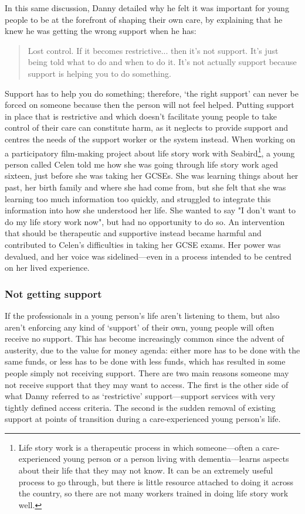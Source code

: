 In this same discussion, Danny detailed why he felt it was important for young people to be at the forefront of shaping their own care, by explaining that he knew he was getting the wrong support when he has:
\begin{quote}
Lost control. If it becomes restrictive... then it's not support. It's just being told what to do and when to do it. It's not actually support because support is helping you to do something.
\end{quote}
Support has to help you do something; therefore, `the right support' can never be forced on someone because then the person will not feel helped. Putting support in place that is restrictive and which doesn't facilitate young people to take control of their care can constitute harm, as it neglects to provide support and centres the needs of the support worker or the system instead.  When working on a participatory film-making project about life story work with Seabird\footnote{Life story work is a therapeutic process in which someone—often a care-experienced young person or a person living with dementia—learns aspects about their life that they may not know. It can be an extremely useful process to go through, but there is little resource attached to doing it across the country, so there are not many workers trained in doing life story work well.}, a young person called Celen told me how she was going through life story work aged sixteen, just before she was taking her GCSEs. She was learning things about her past, her birth family and where she had come from, but she felt that she was learning too much information too quickly, and struggled to integrate this information into how she understood her life. She wanted to say "I don't want to do my life story work now", but had no opportunity to do so. An intervention that should be therapeutic and supportive instead became harmful and contributed to Celen’s difficulties in taking her GCSE exams. Her power was devalued, and her voice was sidelined—even in a process intended to be centred on her lived experience.

\subsubsection{Not getting support}
If the professionals in a young person's life aren't listening to them, but also aren’t enforcing any kind of `support' of their own, young people will often receive no support. This has become increasingly common since the advent of austerity, due to the value for money agenda: either more has to be done with the same funds, or less has to be done with less funds, which has resulted in some people simply not receiving support. There are two main reasons someone may not receive support that they may want to access. The first is the other side of what Danny referred to as `restrictive' support—support services with very tightly defined access criteria. The second is the sudden removal of existing support at points of transition during a care-experienced young person's life.

